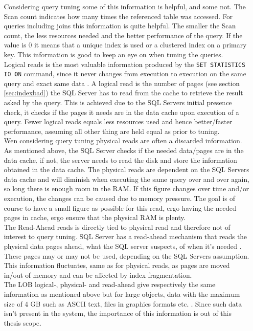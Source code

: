 \documentclass{cslthse-msc}
\begin{document}
Considering query tuning some of this information is helpful, and some not. The Scan count indicates how many times the referenced table was accessed. For queries including joins this information is quite helpful. The smaller the Scan count, the less resources needed and the better performance of the query. If the value is 0 it means that a unique index is used or a clustered index on a primary key. This information is good to keep an eye on when tuning the queries.\\ Logical reads is the most valuable information produced by the \texttt{SET STATISTICS IO ON} command, since it never changes from execution to execution on the same query and exact same data    \cite{IO}. A logical read is the number of pages (see section \ref{sec:indexbad}) the SQL Server has to read from the cache to retrieve the result asked by the query. This is achieved due to the SQL Servers initial presence check, it checks if the pages it needs are in the data cache upon execution of a query. Fewer logical reads equals less resources used and hence better/faster performance, assuming all other thing are held equal as prior to tuning.\\ Wen considering query tuning physical reads are often a discarded information. As mentioned above, the SQL Server checks if the needed data/pages are in the data cache, if not, the server needs to read the disk and store the information obtained in the data cache. The physical reads are dependent on the SQL Servers data cache and will diminish when executing the same query over and over again,  so long there is enough room in the RAM. If this figure changes over time and/or execution, the changes can be caused due to memory pressure. The goal is of course to have a small figure as possible for this read, ergo having the needed pages in cache, ergo ensure that the physical RAM is plenty.\\ The Read-Ahead reads is directly tied to physical read and therefore not of interest to query tuning. SQL Server has a read-ahead mechanism that reads the physical data pages ahead, what the SQL server suspects, of when it's needed    \cite{readahead}. These pages may or may not be used, depending on the SQL Servers assumption. This information fluctuates, same as for physical reads, as pages are moved in/out of memory and can be affected by index fragmentation.\\ The LOB logical-, physical- and read-ahead give respectively the same information as mentioned above but for large objects, data with the maximum size of 4 GB such as ASCII text, files in graphics formats etc.    \cite{LOB}.  Since such data isn't present in the system, the importance of this information is out of this thesis scope.\\\\
\end{document}
